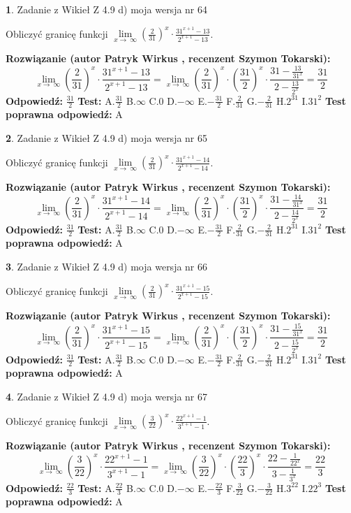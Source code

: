 \documentclass[12pt, a4paper]{article}
\theoremstyle{definition} %
\newtheorem{zad}{}
\newcommand{\zadStart}[1]{\begin{zad}#1\newline}
\newcommand{\zadStop}{\end{zad}}
\newcommand{\rozwStart}[2]{\noindent \textbf{Rozwiązanie (autor #1 , recenzent #2): }\newline}
\newcommand{\rozwStop}{\newline}
\newcommand{\odpStart}{\noindent \textbf{Odpowiedź:}\newline}
\newcommand{\odpStop}{\newline}
\newcommand{\testStart}{\noindent \textbf{Test:}\newline}
\newcommand{\testStop}{\newline}
\newcommand{\kluczStart}{\noindent \textbf{Test poprawna odpowiedź:}\newline}
\newcommand{\kluczStop}{\newline}
\begin{document}
\zadStart{Zadanie z Wikieł Z 4.9 d) moja wersja nr 64}


Obliczyć granicę funkcji  $\lim\limits_{x\to\ \infty}(\frac{2}{31})^{x}\cdot\frac{31^{x+1}-13}{2^{x+1}-13}$.
\zadStop
\rozwStart{Patryk Wirkus}{Szymon Tokarski}
$$\lim\limits_{x\to\ \infty}(\frac{2}{31})^{x}\cdot\frac{31^{x+1}-13}{2^{x+1}-13}=\lim\limits_{x\to\ \infty}(\frac{2}{31})^{x}\cdot(\frac{31}{2})^{x} \cdot \frac{31-\frac{13}{31^{x}}}{2-\frac{13}{2^{x}}} = \frac{31}{2}$$
\rozwStop
\odpStart
$\frac{31}{2}$
\odpStop
\testStart
A.$\frac{31}{2}$ B.$\infty$ C.$0$ D.$-\infty$ E.$-\frac{31}{2}$
F.$\frac{2}{31}$ G.$-\frac{2}{31}$
H.$2^{31}$
I.$31^{2}$
\testStop
\kluczStart
A
\kluczStop



\zadStart{Zadanie z Wikieł Z 4.9 d) moja wersja nr 65}


Obliczyć granicę funkcji  $\lim\limits_{x\to\ \infty}(\frac{2}{31})^{x}\cdot\frac{31^{x+1}-14}{2^{x+1}-14}$.
\zadStop
\rozwStart{Patryk Wirkus}{Szymon Tokarski}
$$\lim\limits_{x\to\ \infty}(\frac{2}{31})^{x}\cdot\frac{31^{x+1}-14}{2^{x+1}-14}=\lim\limits_{x\to\ \infty}(\frac{2}{31})^{x}\cdot(\frac{31}{2})^{x} \cdot \frac{31-\frac{14}{31^{x}}}{2-\frac{14}{2^{x}}} = \frac{31}{2}$$
\rozwStop
\odpStart
$\frac{31}{2}$
\odpStop
\testStart
A.$\frac{31}{2}$ B.$\infty$ C.$0$ D.$-\infty$ E.$-\frac{31}{2}$
F.$\frac{2}{31}$ G.$-\frac{2}{31}$
H.$2^{31}$
I.$31^{2}$
\testStop
\kluczStart
A
\kluczStop



\zadStart{Zadanie z Wikieł Z 4.9 d) moja wersja nr 66}


Obliczyć granicę funkcji  $\lim\limits_{x\to\ \infty}(\frac{2}{31})^{x}\cdot\frac{31^{x+1}-15}{2^{x+1}-15}$.
\zadStop
\rozwStart{Patryk Wirkus}{Szymon Tokarski}
$$\lim\limits_{x\to\ \infty}(\frac{2}{31})^{x}\cdot\frac{31^{x+1}-15}{2^{x+1}-15}=\lim\limits_{x\to\ \infty}(\frac{2}{31})^{x}\cdot(\frac{31}{2})^{x} \cdot \frac{31-\frac{15}{31^{x}}}{2-\frac{15}{2^{x}}} = \frac{31}{2}$$
\rozwStop
\odpStart
$\frac{31}{2}$
\odpStop
\testStart
A.$\frac{31}{2}$ B.$\infty$ C.$0$ D.$-\infty$ E.$-\frac{31}{2}$
F.$\frac{2}{31}$ G.$-\frac{2}{31}$
H.$2^{31}$
I.$31^{2}$
\testStop
\kluczStart
A
\kluczStop



\zadStart{Zadanie z Wikieł Z 4.9 d) moja wersja nr 67}


Obliczyć granicę funkcji  $\lim\limits_{x\to\ \infty}(\frac{3}{22})^{x}\cdot\frac{22^{x+1}-1}{3^{x+1}-1}$.
\zadStop
\rozwStart{Patryk Wirkus}{Szymon Tokarski}
$$\lim\limits_{x\to\ \infty}(\frac{3}{22})^{x}\cdot\frac{22^{x+1}-1}{3^{x+1}-1}=\lim\limits_{x\to\ \infty}(\frac{3}{22})^{x}\cdot(\frac{22}{3})^{x} \cdot \frac{22-\frac{1}{22^{x}}}{3-\frac{1}{3^{x}}} = \frac{22}{3}$$
\rozwStop
\odpStart
$\frac{22}{3}$
\odpStop
\testStart
A.$\frac{22}{3}$ B.$\infty$ C.$0$ D.$-\infty$ E.$-\frac{22}{3}$
F.$\frac{3}{22}$ G.$-\frac{3}{22}$
H.$3^{22}$
I.$22^{3}$
\testStop
\kluczStart
A
\kluczStop
\end{document}
